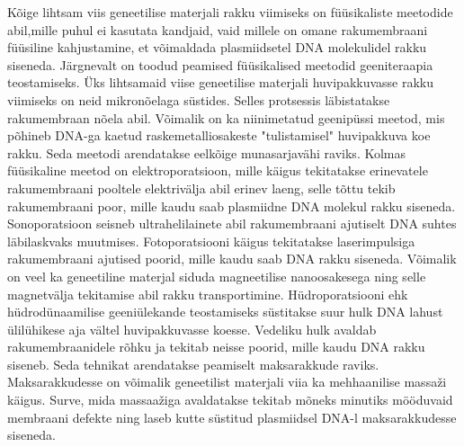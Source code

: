 \documentclass{trkut}%
\begin{document}
Kõige lihtsam viis geneetilise materjali rakku viimiseks on füüsikaliste meetodide abil,mille puhul ei kasutata kandjaid, vaid millele on omane rakumembraani füüsiline kahjustamine, et võimaldada plasmiidsetel DNA molekulidel rakku siseneda. Järgnevalt on toodud peamised füüsikalised meetodid geeniteraapia teostamiseks. Üks lihtsamaid viise geneetilise materjali  huvipakkuvasse rakku viimiseks on neid mikronõelaga süstides. Selles protsessis läbistatakse rakumembraan nõela abil. Võimalik on ka niinimetatud geenipüssi meetod, mis põhineb DNA-ga kaetud raskemetalliosakeste "tulistamisel" huvipakkuva koe rakku. Seda meetodi arendatakse eelkõige munasarjavähi raviks. Kolmas füüsikaline meetod on elektroporatsioon,  mille käigus tekitatakse erinevatele rakumembraani pooltele elektrivälja abil erinev laeng, selle tõttu tekib rakumembraani poor, mille kaudu saab plasmiidne DNA molekul rakku siseneda. Sonoporatsioon seisneb ultrahelilainete abil rakumembraani ajutiselt DNA suhtes läbilaskvaks muutmises. Fotoporatsiooni käigus tekitatakse laserimpulsiga rakumembraani ajutised poorid, mille kaudu saab DNA rakku siseneda. Võimalik on veel ka geneetiline materjal siduda magneetilise nanoosakesega ning selle magnetvälja tekitamise abil rakku transportimine. Hüdroporatsiooni ehk hüdrodünaamilise geeniülekande teostamiseks süstitakse suur hulk DNA lahust ülilühikese aja vältel huvipakkuvasse koesse. Vedeliku hulk avaldab rakumembraanidele rõhku ja tekitab neisse poorid, mille kaudu DNA rakku siseneb. Seda tehnikat arendatakse peamiselt maksarakkude raviks. \parencite{genviisid} Maksarakkudesse on võimalik geneetilist materjali viia ka mehhaanilise massaži käigus. Surve, mida massaažiga avaldatakse tekitab mõneks minutiks mööduvaid membraani defekte ning laseb kutte süstitud plasmiidsel DNA-l maksarakkudesse siseneda. \parencite{MML} 
\end{document}
